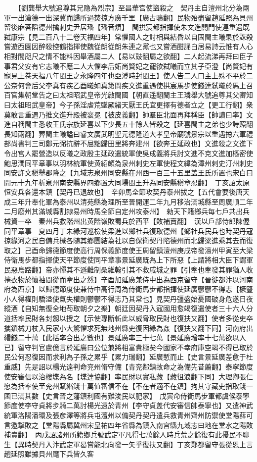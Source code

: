 　　【劉龔舉大號追尊其兄隐為烈宗】至昌華宫使盜殺之　契丹主自澶州北分為兩軍一出滄德一出深冀而歸所過焚掠方廣千里【廣古曠翻】民物殆盡留趙延照為貝州留後麻荅䧟德州擒刺史尹居璠【璠音煩】　閩拱宸都指揮使朱文進閤門使連重遇既弑康宗【見二百八十二卷天福四年】常懼國人之討相與結昏以自固閩主曦果於誅殺嘗遊西園因醉殺控鶴指揮使魏從朗從朗朱連之黨也又嘗酒酣誦白居易詩云惟有人心相對間咫尺之情不能料因舉酒屬二人【易以豉翻屬之欲翻】二人起流涕再拜曰臣子事君父安有它志曦不應二人大懼李后妬尚賢妃之寵欲弑曦而立其子亞澄【尚賢妃有寵見上卷天福八年閩王之永隆四年也亞澄時封閩王】使人告二人曰主上殊不平於二公奈何會后父李真有疾乙酉曦如真第問疾文進重遇使拱宸馬步使錢逹弑曦於馬上召百官集朝堂告之曰太祖昭武皇帝光啟閩國【朝直遥翻閩主王璘舉大號追尊其父審知曰太祖昭武皇帝】今子孫淫虐荒墜厥緒天厭王氏宜更擇有德者立之【更工行翻】衆莫敢言重遇乃推文進升殿被衮冕【被皮義翻】帥羣臣北面再拜稱臣【帥讀曰率】文進自稱閩主悉收王氏宗族延喜以下少長五十餘人皆殺之【延喜閩主之弟也少詩照翻長知兩翻】葬閩主曦謚曰睿文廣武明聖元德隆道大孝皇帝廟號景宗以重遇搃六軍禮部尚書判三司鄭元弼抗辭不屈黜歸田里將奔建州【欲奔王延政也】文進殺之文進下令出宫人罷營造以反曦之政殷主延政遣統軍使吳成義將兵討文進不克文進加樞密使鮑思潤同平章事以羽林統軍使黄紹頗為泉州刺史左軍使程文緯為漳州刺史汀州刺史同安許文稹舉郡降之【九域志泉州同安縣在州西一百三十五里盖王氏所置也宋白曰開元十九年析泉州南安縣界四鄉置大同場閩王升為同安縣稹章忍翻】　丁亥詔太原恒安兵各還本鎮【契丹已退故也】　辛卯馬全節攻契丹泰州拔之【五代會要後唐天成三年升奉化軍為泰州以清苑縣為理所至晉開運二年九月移治滿城縣至周廣順二年二月廢州其滿城縣割隸易州時馬全節自定州攻泰州】　勑天下籍鄉兵每七戶共出兵械資一卒　秦州兵救階州出黄階嶺敗蜀兵於西平【敗補賣翻】　漢以戶部侍郎陳偓同平章事　夏四月丁未緣河巡檢使梁進以鄉社兵復取德州【鄉社兵民兵也時契丹寇掠緣河之民自備兵械各随其鄉團結為社以自保衛契丹陷德州而北歸梁進乘其去而復取之】己酉命歸德節度使高行周保義節度使王周留鎮澶州庚戌帝發澶州甲寅至大梁侍衛馬步都指揮使天平節度使同平章事景延廣既為上下所惡【上謂將相大臣下謂軍民惡烏路翻】帝亦憚其不遜難制桑維翰引其不救戚城之罪【引牽也牽發其罪猶人收捲衣物於懷袖間從而牽出之然】辛酉加延廣兼侍中出為西京留守【晉徙都汴以河南府為西京】以歸德節度使兼侍中高行周為侍衛馬步都指揮使延廣鬱鬱不得志【橛豎小人得權則驕溢使氣失權則鬱鬱不得志乃其常也】見契丹彊盛始憂國破身危遂日夜縱酒【自知無復全地苟取朝夕之樂】朝廷因契丹入寇國用愈竭復遣使者三十六人分道括率民財各封劔以授之【示使專斷斬此以威脅取民財也復扶又翻】使者多從吏卒攜鎖械刀杖入民家小大驚懼求死無地州縣吏復因緣為姦【復扶又翻下同】河南府出緡錢二十萬【此括率合出之數也】景延廣率三十七萬【景延廣增率十七萬欲以入已】留守判官盧億言於延廣曰公位兼將相富貴極矣今國家不幸府庫空竭不得已取於民公何忍復因而求利為子孫之累乎【累力瑞翻】延廣慙而止【史言景延廣差愈于杜重威】先是詔以楊光遠判命兖州脩守備【青兖鄰鎮故命之為備先昔薦翻】泰寧節度使安審信以治樓堞為名【堞逹協翻】率民財以實私藏【藏徂浪翻下同】大理卿張仁愿為括率使至兖州賦緡錢十萬值審信不在【不在者適不在鎮】拘其守藏吏指取錢一囷已滿其數【史言晉之藩鎮利國有難浚民以肥家】　戊寅命侍衛馬步軍都虞候泰寧節度使李守貞將步騎二萬討楊光遠於青州【李守貞盖代安審信帥泰寧也】又遣神武統軍洛陽潘環及張彦澤等將兵屯澶州以備契丹契丹遣兵救青州齊州防禦使堂陽薛可言邀撃敗之【堂陽縣屬冀州宋皇祐四年省縣為鎮入南宫縣九域志曰地在堂水之陽敗補賣翻】　丙戌詔諸州所籍鄉兵號武定軍凡得七萬餘人時兵荒之餘復有此擾民不聊生【異時契丹入汴武定軍曷嘗能北向發一矢乎復扶又翻】丁亥鄴都留守張從恩上言趙延照雖據貝州麾下兵皆久客